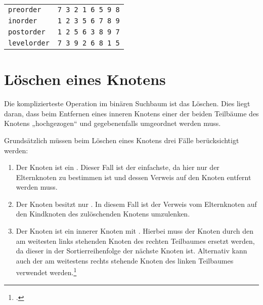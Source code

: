 \documentclass{lehramt-informatik-haupt}
\begin{document}
\begin{center}
\end{center}

\begin{center}
\begin{tabular}{ll}
\texttt{preorder} & \texttt{7 3 2 1 6 5 9 8} \\
\texttt{inorder} & \texttt{1 2 3 5 6 7 8 9} \\
\texttt{postorder} & \texttt{1 2 5 6 3 8 9 7} \\
\texttt{levelorder} & \texttt{7 3 9 2 6 8 1 5} \\
\end{tabular}
\end{center}

%

\section{Löschen eines Knotens}

Die komplizierteste Operation im binären Suchbaum ist das Löschen. Dies
liegt daran, dass beim Entfernen eines inneren Knotens einer der beiden
Teilbäume des Knotens „hochgezogen“ und gegebenenfalls umgeordnet werden
muss.

Grundsätzlich müssen beim Löschen eines Knotens drei Fälle
berücksichtigt werden:

\begin{enumerate}
\item Der Knoten ist ein . Dieser Fall ist der einfachste,
da hier nur der Elternknoten zu bestimmen ist und dessen Verweis auf den
Knoten entfernt werden muss.

\item Der Knoten besitzt nur . In diesem Fall
ist der Verweis vom Elternknoten auf den Kindknoten des zulöschenden
Knotens umzulenken.

\item Der Knoten ist ein innerer Knoten mit .
Hierbei muss der Knoten durch den am weitesten links stehenden Knoten
des rechten Teilbaumes ersetzt werden, da dieser in der
Sortierreihenfolge der nächste Knoten ist. Alternativ kann auch der am
weitestens rechts stehende Knoten des linken Teilbaumes verwendet
werden.\footcite[364]{saake}
\end{enumerate}
\end{document}

